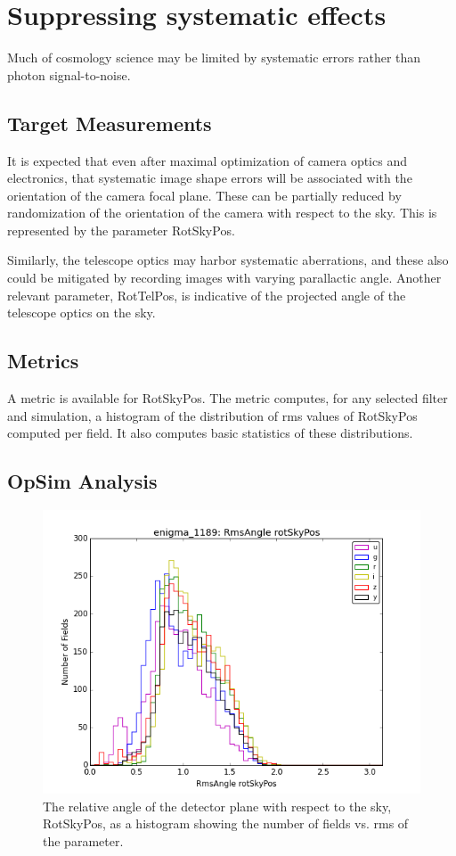 \section{Suppressing systematic effects}

Much of cosmology science may be limited by systematic errors rather than photon signal-to-noise.  

\subsection{Target Measurements}

It is expected that even after maximal optimization of camera optics and electronics, that systematic image shape errors will be associated with the orientation of the camera focal plane.  These can be partially reduced by randomization of the orientation of the camera with respect to the sky.  This is represented by the parameter RotSkyPos.  

Similarly, the telescope optics may harbor systematic aberrations, and these also could be mitigated by recording images with varying parallactic angle.  Another relevant parameter, RotTelPos, is indicative of the projected angle of the telescope optics on the sky.  


\subsection{Metrics}

A metric is available for RotSkyPos.  The metric computes, for any selected filter and simulation, a histogram of the distribution of rms values of RotSkyPos computed per field. It also computes basic statistics of these distributions.

\subsection{OpSim Analysis}


\begin{figure}
\includegraphics[width=5.0in]{enigma1189RmsAnglerotSkyPosugrizybandallpropsOPSIComboHistogram.png}
\caption{The relative angle of the detector plane with respect to the sky, RotSkyPos, as a histogram showing the number of fields vs. rms of the parameter.}
\label{RotSkyPos}
\end{figure}

